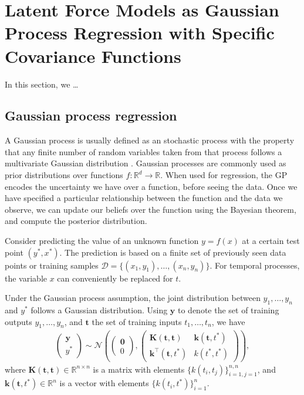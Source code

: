 \documentclass[journal]{IEEEtran}
\begin{document}

\section{Latent Force Models as Gaussian Process Regression with Specific Covariance Functions}

In this section, we \ldots

\subsection{Gaussian process regression}\label{sec:gp:regression}
%

A Gaussian process is usually defined as an stochastic process with the property that any
finite number of random variables taken from that process follows a multivariate Gaussian
distribution \cite{Rasmussen+Williams:2006, Shanmugan:randomSignals:88}. Gaussian processes
are commonly used as prior distributions over functions $f: \mathbb{R}^d\rightarrow \mathbb{R}$.
When used for regression, the GP encodes the uncertainty we have over a function, before seeing the data. Once we
have specified a particular relationship between the function and the data we observe, we can update our beliefs over
the function using the Bayesian theorem, and compute the posterior distribution.

Consider predicting the value of an unknown function $y = f(x)$ at a certain test point $(y^*, x^*)$. The prediction
is based on a finite set of previously seen data points or training samples
$\mathcal{D}=\{(x_1, y_1), \ldots, (x_n, y_n)\}$. For temporal processes, the variable $x$ can conveniently be
replaced for $t$.

Under the Gaussian process assumption, the joint distribution between $y_1, \ldots, y_n$ and $y^*$ follows a Gaussian
distribution. Using $\mathbf{y}$ to denote the set of training outputs $y_1, \ldots, y_n$, and $\mathbf{t}$ the set
of training inputs $t_1, \ldots, t_n$, we have
\begin{align*}
\begin{pmatrix}
\mathbf{y}\\
y^*
\end{pmatrix}\sim
\mathcal{N}
\left(
\begin{pmatrix}
\mathbf{0}\\
0
\end{pmatrix},
\begin{pmatrix}
\mathbf{K}(\mathbf{t}, \mathbf{t}) & \mathbf{k}(\mathbf{t}, t^*)\\
\mathbf{k}^{\top}(\mathbf{t}, t^*) & k(t^*, t^*)
\end{pmatrix}
\right),
\end{align*}
where $\mathbf{K}(\mathbf{t}, \mathbf{t})\in \mathbb{R}^{n\times n}$ is a matrix with elements
$\{k(t_i, t_j)\}_{i=1, j=1}^{n,n}$, and $\mathbf{k}(\mathbf{t}, t^*) \in \mathbb{R}^n$ is a vector with elements
$\{k(t_i, t^*)\}_{i=1}^n$.
\end{document}
